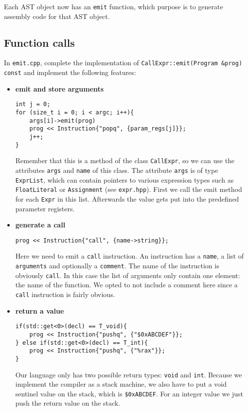 \documentclass{report}
\begin{document}
	
	Each AST object now has an \texttt{emit} function, which purpose is to generate assembly code for that AST object.
	\subsection{Function calls}
	In \texttt{emit.cpp}, complete the implementation of \texttt{CallExpr::emit(Program \&prog) const} and implement the following features:
	
	\begin{itemize}
		\item \textbf{emit and store arguments}
		\begin{lstlisting}
int j = 0;
for (size_t i = 0; i < argc; i++){
	args[i]->emit(prog)
	prog << Instruction{"popq", {param_regs[j]}};
	j++;
}
		\end{lstlisting}
		Remember that this is a method of the class \texttt{CallExpr}, so we can use the attributes \texttt{args} and \texttt{name} of this class. The attribute \texttt{args} is of type \texttt{ExprList}, which can contain pointers to various expression types such as \texttt{FloatLiteral} or \texttt{Assignment} (see \texttt{expr.hpp}). First we call the emit method for each \texttt{Expr} in this list. Afterwards the value gets put into the predefined parameter registers.
		
		\item \textbf{generate a call}
		\begin{lstlisting}
prog << Instruction{"call", {name->string}};
		\end{lstlisting}
		Here we need to emit a \texttt{call} instruction. An instruction has a \texttt{name}, a list of \texttt{arguments} and optionally a \texttt{comment}. The name of the instruction is obviously \texttt{call}. In this case the list of arguments only contain one element: the name of the function. We opted to not include a comment here since a \texttt{call} instruction is fairly obvious.
		
		\item \textbf{return a value}
		\begin{lstlisting}
if(std::get<0>(decl) == T_void){
	prog << Instruction{"pushq", {"$0xABCDEF"}};
} else if(std::get<0>(decl) == T_int){
	prog << Instruction{"pushq", {"%rax"}};
}
		\end{lstlisting}
		Our language only has two possible return types: \texttt{void} and \texttt{int}. Because we implement the compiler as a stack machine, we also have to put a void sentinel value on the stack, which is \texttt{\$0xABCDEF}. For an integer value we just push the return value on the stack.
	\end{itemize}
\end{document}
